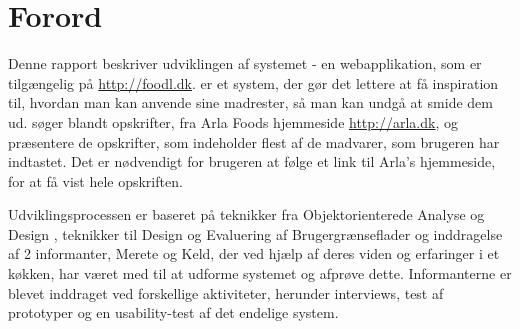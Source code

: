 \chapter*{Forord}
Denne rapport beskriver udviklingen af systemet \Foodl{} - en webapplikation, som er tilgængelig på \url{http://foodl.dk}. \Foodl{} er et system, der gør det lettere at få inspiration til, hvordan man kan anvende sine madrester, så man kan undgå at smide dem ud. \Foodl{} søger blandt opskrifter, fra Arla Foods hjemmeside \url{http://arla.dk}, og præsentere de opskrifter, som indeholder flest af de madvarer, som brugeren har indtastet. Det er nødvendigt for brugeren at følge et link til Arla's hjemmeside, for at få vist hele opskriften.

Udviklingsprocessen er baseret på teknikker fra Objektorienterede Analyse og Design \cite{ooad}, teknikker til Design og Evaluering af Brugergrænseflader \cite{deb} og inddragelse af 2 informanter, Merete og Keld, der ved hjælp af deres viden og erfaringer i et køkken, har været med til at udforme systemet og afprøve dette. Informanterne er blevet inddraget ved forskellige aktiviteter, herunder interviews, test af prototyper og en usability-test af det endelige system.

